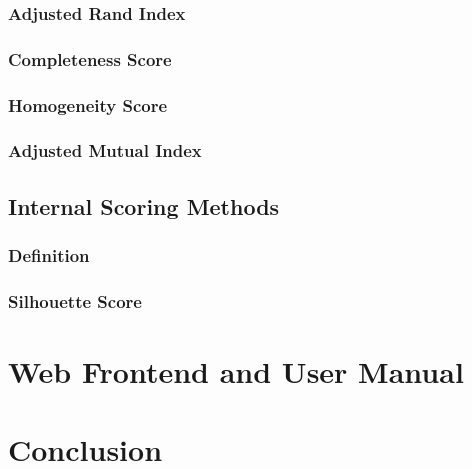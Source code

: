 \documentclass[12pt, english]
{article}
\begin{document}
\subsubsection{Adjusted Rand Index}

\subsubsection{Completeness Score}

\subsubsection{Homogeneity Score}

\subsubsection{Adjusted Mutual Index}

\subsection{Internal Scoring Methods}
\subsubsection{Definition}

\subsubsection{Silhouette Score}



\section{Web Frontend and User Manual}


\section{Conclusion}


\newpage

\printglossary[style=altlist,title=Glossary]
 
\printglossary[type=\acronymtype,style=long]
 


\newpage




\nocite{*}

\begin{appendices}
	
\end{appendices}
\end{document}
